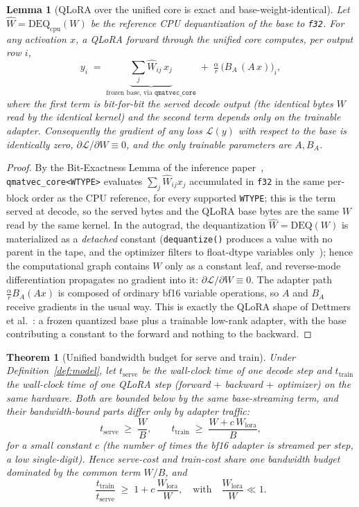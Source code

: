 \documentclass[11pt]{article}
\newtheorem{theorem}{Theorem}
\newtheorem{lemma}{Lemma}
\begin{document}
\begin{lemma}[QLoRA over the unified core is exact and base-weight-identical]
\label{lem:qlora}
Let $\hat W = \mathrm{DEQ}_{\text{cpu}}(W)$ be the reference CPU dequantization of the base to \texttt{f32}. For any activation $x$, a QLoRA forward through the unified core computes, per output row $i$,
\[
y_i \;=\; \underbrace{\textstyle\sum_j \hat W_{ij}\,x_j}_{\text{frozen base, via }\texttt{qmatvec\_core}} \;+\; \tfrac{\alpha}{r}\,\big(B_{\!A}\,(A\,x)\big)_i,
\]
where the first term is \emph{bit-for-bit} the served decode output (the identical bytes $W$ read by the identical kernel) and the second term depends only on the trainable adapter. Consequently the gradient of any loss $\mathcal{L}(y)$ with respect to the base is identically zero, $\partial \mathcal{L}/\partial W \equiv 0$, and the only trainable parameters are $A, B_{\!A}$.
\end{lemma}

\begin{proof}
By the Bit-Exactness Lemma of the inference paper~\cite{hanzo-rocm}, \texttt{qmatvec\_core<WTYPE>} evaluates $\sum_j \hat W_{ij} x_j$ accumulated in \texttt{f32} in the same per-block order as the CPU reference, for every supported \texttt{WTYPE}; this is the term served at decode, so the served bytes and the QLoRA base bytes are the same $W$ read by the same kernel. In the autograd, the dequantization $\hat W = \mathrm{DEQ}(W)$ is materialized as a \emph{detached} constant (\texttt{dequantize()} produces a value with no parent in the tape, and the optimizer filters to float-dtype variables only~\cite{hanzo-train}); hence the computational graph contains $W$ only as a constant leaf, and reverse-mode differentiation propagates no gradient into it: $\partial\mathcal{L}/\partial W \equiv 0$. The adapter path $\tfrac{\alpha}{r} B_{\!A}(Ax)$ is composed of ordinary bf16 variable operations, so $A$ and $B_{\!A}$ receive gradients in the usual way. This is exactly the QLoRA shape of Dettmers et al.~\cite{qlora}: a frozen quantized base plus a trainable low-rank adapter, with the base contributing a constant to the forward and nothing to the backward.
\end{proof}

\begin{theorem}[Unified bandwidth budget for serve and train]
\label{thm:unified}
Under Definition~\ref{def:model}, let $t_{\text{serve}}$ be the wall-clock time of one decode step and $t_{\text{train}}$ the wall-clock time of one QLoRA step (forward $+$ backward $+$ optimizer) on the \emph{same} hardware. Both are bounded below by the \emph{same} base-streaming term, and their bandwidth-bound parts differ only by adapter traffic:
\[
t_{\text{serve}} \;\geq\; \frac{W}{B}, \qquad
t_{\text{train}} \;\geq\; \frac{W + c\,W_{\text{lora}}}{B},
\]
for a small constant $c$ (the number of times the bf16 adapter is streamed per step, a low single-digit). Hence serve-cost and train-cost share one bandwidth budget dominated by the common term $W/B$, and
\[
\frac{t_{\text{train}}}{t_{\text{serve}}} \;\geq\; 1 + c\,\frac{W_{\text{lora}}}{W},
\quad\text{with}\quad \frac{W_{\text{lora}}}{W}\ll 1 .
\]
\end{theorem}
\end{document}
